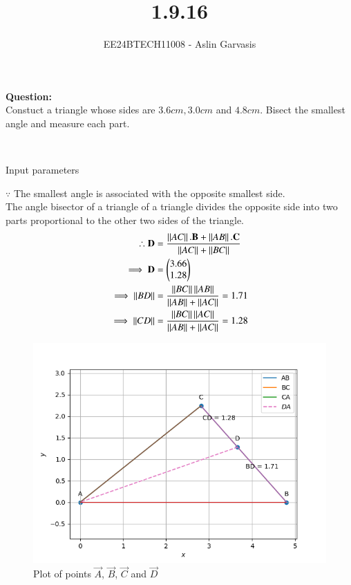 \documentclass[journal]{IEEEtran}
\begin{document}

\vspace{3cm}
\title{1.9.16}
\author{EE24BTECH11008 - Aslin Garvasis
}
{\let\newpage\relax\maketitle}

\renewcommand{\thefigure}{\theenumi}
\renewcommand{\thetable}{\theenumi}
\setlength{\intextsep}{10pt} %


\renewcommand{\thetable}{\theenumi}
 \textbf{Question:}\\Constuct a triangle whose sides are $3.6cm, 3.0cm$ and $4.8cm.$ Bisect the smallest angle and measure each part.
 
 \solution \\ 
 \begin{table}[h!]    
  \centering
  
  \caption{Input parameters}
  \label{tab1.1.9.16}
\end{table}
$\because$ The smallest angle is associated with the opposite smallest side.\\
The angle bisector of a triangle of a triangle divides the opposite side into two parts proportional to the other two sides of the triangle.\\

\begin{align}
	\therefore \mathbf{D}&=\frac{\left\lVert AC\right\rVert.\mathbf{B}+\left\lVert AB\right\rVert.\mathbf{C}}{\left\lVert AC\right\rVert+\left\lVert BC\right\rVert}\\
	\implies \mathbf{D}&=\begin{pmatrix}3.66\\1.28\end{pmatrix}\\
	\implies \left\lVert BD\right\rVert&=\frac{\left\lVert BC\right\rVert\left\lVert AB\right\rVert}{\left\lVert AB\right\rVert+\left\lVert AC\right\rVert}=1.71\\
	\implies \left\lVert CD\right\rVert&=\frac{\left\lVert BC\right\rVert\left\lVert AC\right\rVert}{\left\lVert AB\right\rVert+\left\lVert AC\right\rVert}=1.28
 \end{align}
		\newpage


		\begin{figure}[h!]
                \centering
               \includegraphics[width=0.7\linewidth]{figs/Fig1.png}
			\caption{Plot of points $\vec{A}$, $\vec{B}$, $\vec{C}$ and $\vec{D}$}
               
               \end{figure}
\end{document}
